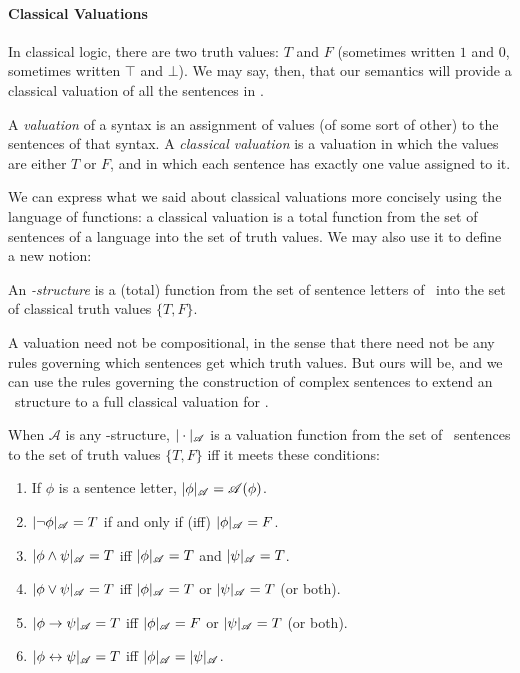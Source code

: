 \paragraph{Classical Valuations} In classical logic, there are two truth values: $T$ and $F$ (sometimes written $1$ and $0$, sometimes written $\top$ and $\bot$). We may say, then, that our semantics will provide a classical valuation of all the sentences in \lone.
\begin{definition}[Valuation]
	A \emph{valuation} of a syntax is an assignment of values (of some sort of other) to the sentences of that syntax. A \emph{classical valuation} is a valuation in which the values are either $T$ or $F$, and in which each sentence has exactly one value assigned to it.
\end{definition}
We can express what we said about classical valuations more concisely using the language of functions: a classical valuation is a total function from the set of sentences of a language into the set of truth values. We may also use it to define a new notion: 
	\begin{definition}
		An \emph{\lone-structure} is a (total) function from the set of sentence letters of \lone\ into the set of classical truth values $\{T,F\}$.
	\end{definition}

	A valuation need not be compositional, in the sense that there need not be any rules governing which sentences get which truth values. But ours will be, and we can use the rules governing the construction of complex sentences to extend an \lone\ structure to a full classical valuation for \lone.
\begin{definition}\label{value}
		When $\mathscr{A}$ is any \lone-structure, $|\cdot|_{\mathscr{A}}$ is a valuation function from the set of \lone\ sentences to the set of truth values $\{T, F\}$ iff it meets these conditions: \begin{enumerate}
			\item If $\phi$ is a sentence letter, $|\phi|_{\mathscr{A}} = \mathscr{A}(\phi)$.
			\item $|\neg \phi|_{\mathscr{A}} = T$ if and only if (iff) $|\phi|_{\mathscr{A}}= F$.
			\item $|\phi \wedge \psi|_{\mathscr{A}} = T$ iff $|\phi|_{\mathscr{A}}=T$ and $|\psi|_{\mathscr{A}}=T$.
			\item $|\phi \vee \psi|_{\mathscr{A}} = T$ iff $|\phi|_{\mathscr{A}}=T$ or $|\psi|_{\mathscr{A}}=T$ (or both).
			\item $|\phi \to \psi|_{\mathscr{A}} = T$ iff $|\phi|_{\mathscr{A}}=F$ or $|\psi|_{\mathscr{A}}=T$ (or both).
			\item $|\phi \leftrightarrow \psi|_{\mathscr{A}} = T$ iff $|\phi|_{\mathscr{A}}=|\psi|_{\mathscr{A}}$.
		\end{enumerate}
	\end{definition}

